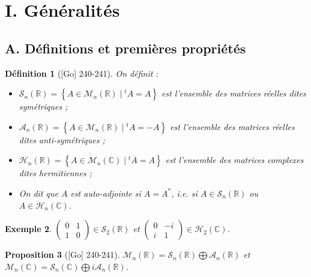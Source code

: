 \documentclass[10pt, a4paper, parskip=full, twoside, twocolumn]{report}
\newtheorem{definition}{Définition}
\newtheorem{proposition}[definition]{Proposition}
\newtheorem{example}[definition]{Exemple}
\newcommand{\IC}{\mathbb{C}}
\newcommand{\IR}{\mathbb{R}}
\newcommand{\M}{\mathcal{M}}
\newcommand{\A}{\mathscr{A}}
\begin{document}
\section*{I. Généralités}
\subsection*{A. Définitions et premières propriétés}

\begin{definition}[\textnormal{[Go] 240-241}]
	On définit :
	\begin{itemize}
		\item $\mathcal{S}_n(\IR) = \left\{A\in\M_n(\IR)\mid {}^tA=A\right\}$ est l'ensemble des matrices réelles dites \emph{symétriques} ;
		\item $\A_n(\IR) = \left\{A\in\M_n(\IR)\mid {}^tA=-A\right\}$ est l'ensemble des matrices réelles dites \emph{anti-symétriques} ;
		\item $\mathcal{H}_n(\IR) = \left\{A\in\M_n(\IC)\mid {}^t\overline{A} = A\right\}$ est l'ensemble des matrices complexes dites \emph{hermitiennes} ;
		\item On dit que $A$ est \emph{auto-adjointe} si $A=A^*$, \emph{i.e.} si $A\in \mathcal{S}_n(\IR)$ ou $A\in\mathcal{H}_n(\IC)$.
	\end{itemize}
\end{definition}

\begin{example}
	$\left(\begin{smallmatrix}
		0&1\\1&0
	\end{smallmatrix}\right)\in\mathcal{S}_2(\IR)$ et 
	$\left(\begin{smallmatrix}
		0&-i\\i&1
	\end{smallmatrix}\right)\in\mathcal{H}_2(\IC)$.
\end{example}

\begin{proposition}[\textnormal{[Go] 240-241}]
	$\M_n(\IR) = \mathcal{S}_n(\IR)\bigoplus\A_n(\IR)$
	et $\M_n(\IC) = \mathcal{S}_n(\IC)\bigoplus i\A_n(\IR)$.
\end{proposition}
\end{document}

